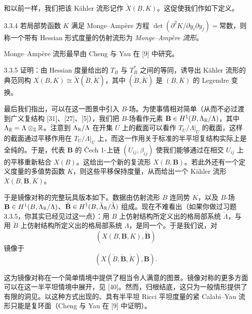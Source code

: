 
和以前一样，我们把该 Kähler 流形记作 $\check X(B,K)$。这促使我们作如下定义。

\begin{definition}{3.3.4}
若局部势函数 $K$ 满足 Monge--Ampère 方程 $\det(\partial^2K/\partial y_i\partial y_j)=\text{常数}$，则称一个带有 Hessian 形式度量的仿射流形为 \emph{Monge--Ampère 流形}。
\end{definition}

Monge--Ampère 流形最早由 Cheng 与 Yau 在 [9] 中研究。

\begin{exercise}{3.3.5}
证明：由 Hessian 度量给出的 $T_B$ 与 $T_B^*$ 之间的等同，诱导出 Kähler 流形的典范同构 $X(B,K)\cong\check X(\check B,\check K)$，其中 $(\check B,\check K)$ 是 $(B,K)$ 的 Legendre 变换。
\end{exercise}

最后我们指出，可以在这一图景中引入 $B$-场。为使事情相对简单（从而不必过渡到广义复结构 [31]、[27]、[5]），我们把 $B$-场看作元素 $\mathbf{B}\in H^1(B,\Lambda_{\mathbb{R}}/\Lambda)$，其中 $\Lambda_{\mathbb{R}}=\Lambda\otimes_{\mathbb{Z}}\mathbb{R}$。注意到 $\Lambda_{\mathbb{R}}/\Lambda$ 在开集 $U$ 上的截面可以看作 $T_U/\Lambda|_U$ 的截面，这样的截面通过平移作用在 $T_U/\Lambda|_U$ 上，而这一作用关于标准的半平坦复结构实际上是全纯的。于是，代表 $\mathbf{B}$ 的 Čech 1-上链 $(U_{ij},\beta_{ij})$ 使我们能够通过在相交 $U_{ij}$ 上的平移重新粘合 $X(B)$。这给出一个新的复流形 $X(B,\mathbf{B})$。若此外还有一个定义度量的多值势函数 $K$，则这些平移保持度量，从而给出一个 Kähler 流形 $X(B,\mathbf{B},K)$。

于是镜像对称的完整玩具版本如下。数据由仿射流形 $B$ 连同势 $K$，以及 $B$-场 $\mathbf{B}\in H^1(B,\Lambda_{\mathbb{R}}/\Lambda)$、$\check{\mathbf{B}}\in H^1(B,\check\Lambda_{\mathbb{R}}/\check\Lambda)$ 组成。现在不难看出（如果你做过习题 3.3.5，你其实已经见过这一点）：用 $B$ 上仿射结构所定义出的格局部系统 $\check\Lambda$，与用 $\check B$ 上仿射结构所定义出的格局部系统 $\Lambda$，是同一个。于是我们说，对
\begin{equation*}
(X(B,\mathbf{B},K),\check{\mathbf{B}})
\end{equation*}
镜像于
\begin{equation*}
(X(\check B,\check{\mathbf{B}},\check K),\mathbf{B}).
\end{equation*}


这为镜像对称在一个简单情境中提供了相当令人满意的图景。镜像对称的更多方面可以在这一半平坦情境中展开，见 [40]。然而，归根结底，这只为一般情形提供了有限的洞见。以这种方式出现的、具有半平坦 Ricci 平坦度量的紧 Calabi--Yau 流形只能是复环面（Cheng 与 Yau 在 [9] 中证明）。

